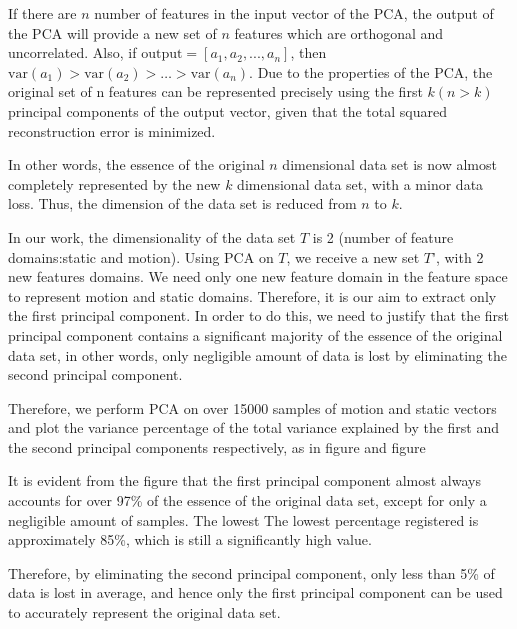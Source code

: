 If there are $n$ number of features in the input vector of the PCA, the output of the
PCA will provide a new set of $n$ features which are orthogonal and uncorrelated. Also, if
$\mathrm{output} =[a_{1}, a_{2}, ..., a_{n}]$, then $\mathrm{var}(a_{1})> \mathrm{var}(a_{2})> \dots > \mathrm{var} (a_{n})$.
Due to the properties of the PCA, the original set of n features can be
represented precisely using the first $k(n>k)$ principal
components of the output vector, given that the total squared reconstruction error
is minimized.

In other words, the essence of the original $n$ dimensional data set is now almost
completely represented by the new $k$ dimensional data set, with a minor data loss. Thus, the
dimension of the data set is reduced from $n$ to $k$.


In our work, the dimensionality of the data set $T$ is 2 (number of feature domains:static
and motion).
Using PCA on $T$, we receive a new set $T’$, with 2 new features domains. We need only one new feature
domain in the feature space to
represent motion and static domains. Therefore, it is our aim to extract only the first principal component.
In order to do this, we need to justify that the first principal component contains a significant majority of
the essence of the original data set, in other words, only negligible amount of data is lost by
eliminating the second principal component.

Therefore, we perform PCA on over 15000 samples of motion and static
vectors and plot the variance percentage of the total variance
explained by the first and the second principal components respectively, as in figure and figure


It is evident from the figure that the first principal component almost always accounts
for over 97\% of the essence of the original data set, except for only a negligible amount
of samples. The lowest The lowest percentage registered is approximately 85\%, which is still a
significantly high value.

Therefore, by eliminating the second principal component, only less than 5\% of data
is lost in average, and hence only the first principal component can be used to accurately
represent the original data set. 